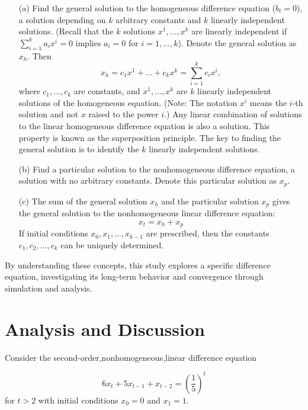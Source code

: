 \documentclass [a4paper]{article}
\begin{document}
\begin{enumerate}
    \item[(a)] Find the general solution to the homogeneous difference equation (\(b_t = 0\)), a solution depending on \(k\) arbitrary constants and \(k\) linearly independent solutions. (Recall that the \(k\) solutions \(x^1, \ldots, x^k\) are linearly independent if \(\sum_{i=1}^{k} a_i x^i = 0\) implies \(a_i = 0\) for \(i = 1, \ldots, k\)). Denote the general solution as \(x_h\). Then 
    \[
    x_h = c_1 x^1 + \ldots + c_k x^k = \sum_{i = 1}^k c_ix^i,
    \]
    where \(c_1, \ldots, c_k\) are constants, and \(x^1, \ldots, x^k\) are \(k\) linearly independent solutions of the homogeneous equation. (Note: The notation \(x^i\) means the \(i\)-th solution and not \(x\) raised to the power \(i\).) Any linear combination of solutions to the linear homogeneous difference equation is also a solution. This property is known as the superposition principle. The key to finding the general solution is to identify the \(k\) linearly independent solutions.

    \item[(b)] Find a particular solution to the nonhomogeneous difference equation, a solution with no arbitrary constants. Denote this particular solution as \(x_p\).

    \item[(c)] The sum of the general solution \(x_h\) and the particular solution \(x_p\) gives the general solution to the nonhomogeneous linear difference equation:
    \[
    x_t = x_h + x_p 
    \]
    If initial conditions \(x_0, x_1, \ldots, x_{k-1}\) are prescribed, then the constants \(c_1, c_2, \ldots, c_k\) can be uniquely determined.
\cite{linda}
\end{enumerate}

By understanding these concepts, this study explores a specific difference equation, investigating  its long-term behavior and convergence through simulation and analysis.
\section{Analysis and Discussion}
Consider the second-order,nonhomogeneous,linear difference equation

\[
6x_t + 5x_{t-1} + x_{t-2} = \left(\frac{1}{5}\right)^t
\]
for \( t > 2 \) with initial conditions \( x_0 = 0 \) and \( x_1 = 1 \).
\end{document}

